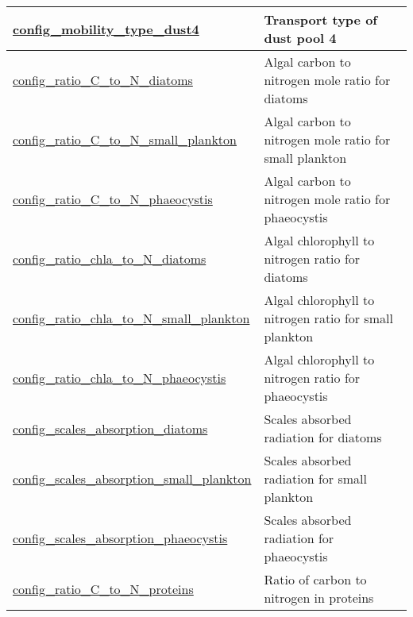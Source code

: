 {\begin{center}
\begin{longtable}{| p{2.0in} || p{4.0in} |}
    \hline
    \hyperref[subsec:nm_sec_config_mobility_type_dust4]{config\_mobility\_type\_dust4} & Transport type of dust pool 4 \\
    \hline
    \hyperref[subsec:nm_sec_config_ratio_C_to_N_diatoms]{config\_ratio\_C\_to\_N\_diatoms} & Algal carbon to nitrogen mole ratio for diatoms \\
    \hline
    \hyperref[subsec:nm_sec_config_ratio_C_to_N_small_plankton]{config\_ratio\_C\_to\_N\_small\_\-plankton} & Algal carbon to nitrogen mole ratio for small plankton \\
    \hline
    \hyperref[subsec:nm_sec_config_ratio_C_to_N_phaeocystis]{config\_ratio\_C\_to\_N\_\-phaeocystis} & Algal carbon to nitrogen mole ratio for phaeocystis \\
    \hline
    \hyperref[subsec:nm_sec_config_ratio_chla_to_N_diatoms]{config\_ratio\_chla\_to\_N\_\-diatoms} & Algal chlorophyll to nitrogen ratio for diatoms \\
    \hline
    \hyperref[subsec:nm_sec_config_ratio_chla_to_N_small_plankton]{config\_ratio\_chla\_to\_N\_\-small\_plankton} & Algal chlorophyll to nitrogen ratio for small plankton \\
    \hline
    \hyperref[subsec:nm_sec_config_ratio_chla_to_N_phaeocystis]{config\_ratio\_chla\_to\_N\_\-phaeocystis} & Algal chlorophyll to nitrogen ratio for phaeocystis \\
    \hline
    \hyperref[subsec:nm_sec_config_scales_absorption_diatoms]{config\_scales\_absorption\_\-diatoms} & Scales absorbed radiation for diatoms \\
    \hline
    \hyperref[subsec:nm_sec_config_scales_absorption_small_plankton]{config\_scales\_absorption\_\-small\_plankton} & Scales absorbed radiation for small plankton \\
    \hline
    \hyperref[subsec:nm_sec_config_scales_absorption_phaeocystis]{config\_scales\_absorption\_\-phaeocystis} & Scales absorbed radiation for phaeocystis \\
    \hline
    \hyperref[subsec:nm_sec_config_ratio_C_to_N_proteins]{config\_ratio\_C\_to\_N\_proteins} & Ratio of carbon to nitrogen in proteins \\
    \hline
\end{longtable}
\end{center}
}
